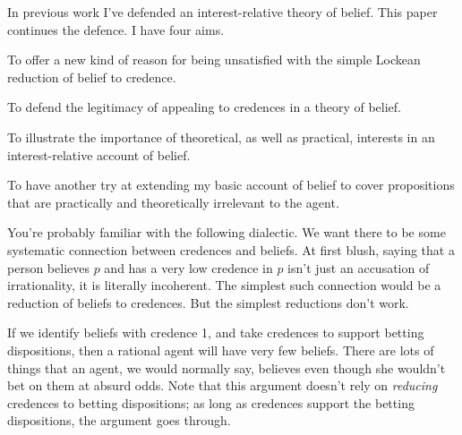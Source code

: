 	\def\mytitle{Games, Beliefs and Credences}
\def\shorttitle{Games, Beliefs and Credences}
\def\myauthor{Brian Weatherson}
\def\latexmode{Book}


\newcommand{\RG}{{\sc Red-Green}}

\renewcommand{\thefootnote}{\fnsymbol{footnote}}
\renewcommand{\thefootnote}{\arabic{footnote}} 



In previous work \citep{Weatherson2005-WEACWD, Weatherson2011-WEADIR, Weatherson2012-WEAKBI} I've defended an interest-relative theory of belief. This paper continues the defence. I have four aims.

\begin{enumerate*}
\item To offer a new kind of reason for being unsatisfied with the simple Lockean reduction of belief to credence.
\item To defend the legitimacy of appealing to credences in a theory of belief.
\item To illustrate the importance of theoretical, as well as practical, interests in an interest-relative account of belief.
\item To have another try at extending my basic account of belief to cover propositions that are practically and theoretically irrelevant to the agent.
\end{enumerate*}

\noindent You're probably familiar with the following dialectic. We want there to be some systematic connection between credences and beliefs. At first blush, saying that a person believes $p$ and has a very low credence in $p$ isn't just an accusation of irrationality, it is literally incoherent. The simplest such connection would be a reduction of beliefs to credences. But the simplest reductions don't work. 

If we identify beliefs with credence 1, and take credences to support betting dispositions, then a rational agent will have very few beliefs. There are lots of things that an agent, we would normally say, believes even though she wouldn't bet on them at absurd odds. Note that this argument doesn't rely on \textit{reducing} credences to betting dispositions; as long as credences support the betting dispositions, the argument goes through.


